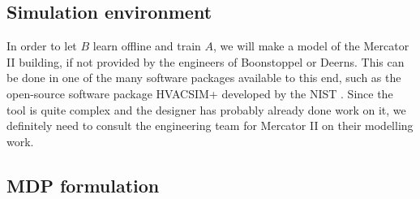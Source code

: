 \documentclass{article}
\theoremstyle{definition}
\theoremstyle{remark}
\begin{document}
\subsection{Simulation environment}
In order to let $B$ learn offline and train $A$, we will make a model of the Mercator II building, if not provided by the engineers of Boonstoppel or Deerns. This can be done in one of the many software packages available to this end, such as the open-source software package HVACSIM+ developed by the NIST \cite{Galler_2021}. Since the tool is quite complex and the designer has probably already done work on it, we definitely need to consult the engineering team for Mercator II on their modelling work.

\subsection{MDP formulation} \label{Method:MDP}
\end{document}
